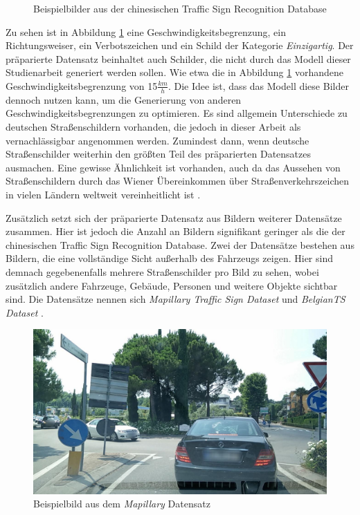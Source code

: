 \begin{figure}[H]
\begin{subfigure}[b]{0.125\textwidth}
     \caption{}
 \end{subfigure}
       \caption{Beispielbilder aus der chinesischen Traffic Sign Recognition Database \cite{chinese-dataset}}
       \label{fig:chinese-dataset-bsp-images}
 \end{figure}

Zu sehen ist in Abbildung \ref{fig:chinese-dataset-bsp-images} eine Geschwindigkeitsbegrenzung, ein Richtungsweiser, ein Verbotszeichen und ein Schild der Kategorie \emph{Einzigartig}. Der präparierte Datensatz beinhaltet auch Schilder, die nicht durch das Modell dieser Studienarbeit generiert werden sollen. Wie etwa die in Abbildung \ref{fig:chinese-dataset-bsp-images} vorhandene Geschwindigkeitsbegrenzung von 15$\frac{km}{h}$. Die Idee ist, dass das Modell diese Bilder dennoch nutzen kann, um die Generierung von anderen Geschwindigkeitsbegrenzungen zu optimieren. Es sind allgemein Unterschiede zu deutschen Straßenschildern vorhanden, die jedoch in dieser Arbeit als vernachlässigbar angenommen werden. Zumindest dann, wenn deutsche Straßenschilder weiterhin den größten Teil des präparierten Datensatzes ausmachen. Eine gewisse Ähnlichkeit ist vorhanden, auch da das Aussehen von Straßenschildern durch das Wiener Übereinkommen über Straßenverkehrszeichen in vielen Ländern weltweit vereinheitlicht ist \cite{vienna-convention}. \cite{chinese-dataset}

Zusätzlich setzt sich der präparierte Datensatz aus Bildern weiterer Datensätze zusammen. Hier ist jedoch die Anzahl an Bildern signifikant geringer als die der chinesischen Traffic Sign Recognition Database. Zwei der Datensätze bestehen aus Bildern, die eine vollständige Sicht außerhalb des Fahrzeugs zeigen. Hier sind demnach gegebenenfalls mehrere Straßenschilder pro Bild zu sehen, wobei zusätzlich andere Fahrzeuge, Gebäude, Personen und weitere Objekte sichtbar sind. Die Datensätze nennen sich \emph{Mapillary Traffic Sign Dataset} und \emph{BelgianTS Dataset} \cite{dataset-mapillary} \cite{dataset-belgiants}.

\begin{figure}[H]
    \centering
    \includegraphics[height=0.3\textwidth]{../images/3 Konzeption des Generative Adversarial Networks/mapillary.jpg}
    \caption{Beispielbild aus dem \emph{Mapillary} Datensatz \cite{dataset-mapillary}}
    \label{fig:full-mapillary-image}
\end{figure}

